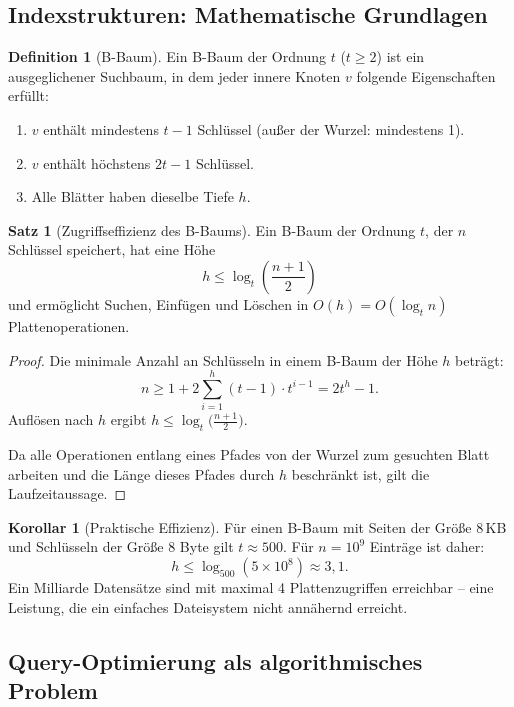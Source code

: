 ﻿\documentclass[a4paper,12pt]{article}
\theoremstyle{definition}
\newtheorem{definition}{Definition}
\newtheorem{satz}{Satz}
\newtheorem{korollar}{Korollar}
\begin{document}
\subsection{Indexstrukturen: Mathematische Grundlagen}

\begin{definition}[B-Baum]
\label{def:bbaum}
Ein B-Baum der Ordnung $t$ ($t \geq 2$) ist ein ausgeglichener Suchbaum, in dem jeder innere Knoten $v$ folgende Eigenschaften erfüllt:
\begin{enumerate}
	\item $v$ enthält mindestens $t-1$ Schlüssel (außer der Wurzel: mindestens 1).
	\item $v$ enthält höchstens $2t-1$ Schlüssel.
	\item Alle Blätter haben dieselbe Tiefe $h$.
\end{enumerate}
\end{definition}

\begin{satz}[Zugriffseffizienz des B-Baums]
\label{satz:bbaum}
Ein B-Baum der Ordnung $t$, der $n$ Schlüssel speichert, hat eine Höhe
\[
h \leq \log_t \!\left(\frac{n+1}{2}\right)
\]
und ermöglicht Suchen, Einfügen und Löschen in $O(h) = O(\log_t n)$ Plattenoperationen.
\end{satz}

\begin{proof}
Die minimale Anzahl an Schlüsseln in einem B-Baum der Höhe $h$ beträgt:
\[
n \geq 1 + 2 \sum_{i=1}^{h}(t-1) \cdot t^{i-1} = 2t^h - 1.
\]
Auflösen nach $h$ ergibt $h \leq \log_t\!\bigl(\frac{n+1}{2}\bigr)$.

Da alle Operationen entlang eines Pfades von der Wurzel zum gesuchten Blatt arbeiten und die Länge dieses Pfades durch $h$ beschränkt ist, gilt die Laufzeitaussage.
\end{proof}

\begin{korollar}[Praktische Effizienz]
\label{kor:effizienz}
Für einen B-Baum mit Seiten der Größe 8\,KB und Schlüsseln der Größe 8 Byte gilt $t \approx 500$. Für $n = 10^9$ Einträge ist daher:
\[
h \leq \log_{500}(5 \times 10^8) \approx 3{,}1.
\]
Ein Milliarde Datensätze sind mit maximal 4 Plattenzugriffen erreichbar -- eine Leistung, die ein einfaches Dateisystem nicht annähernd erreicht.
\end{korollar}

\subsection{Query-Optimierung als algorithmisches Problem}
\end{document}
